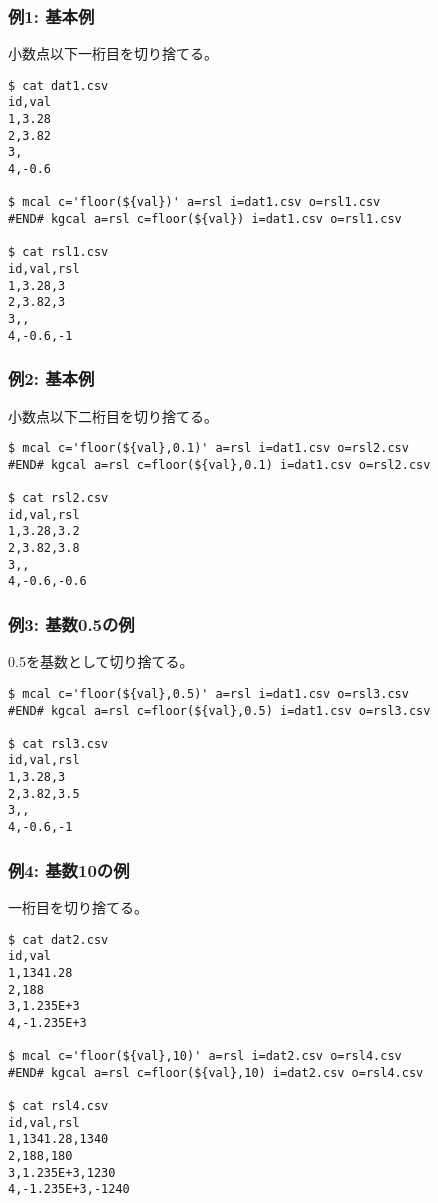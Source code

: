 
\subsubsection*{例1: 基本例}

小数点以下一桁目を切り捨てる。

\begin{Verbatim}[baselinestretch=0.7,frame=single]
$ cat dat1.csv
id,val
1,3.28
2,3.82
3,
4,-0.6

$ mcal c='floor(${val})' a=rsl i=dat1.csv o=rsl1.csv
#END# kgcal a=rsl c=floor(${val}) i=dat1.csv o=rsl1.csv

$ cat rsl1.csv
id,val,rsl
1,3.28,3
2,3.82,3
3,,
4,-0.6,-1
\end{Verbatim}

\subsubsection*{例2: 基本例}

小数点以下二桁目を切り捨てる。

\begin{Verbatim}[baselinestretch=0.7,frame=single]
$ mcal c='floor(${val},0.1)' a=rsl i=dat1.csv o=rsl2.csv
#END# kgcal a=rsl c=floor(${val},0.1) i=dat1.csv o=rsl2.csv

$ cat rsl2.csv
id,val,rsl
1,3.28,3.2
2,3.82,3.8
3,,
4,-0.6,-0.6
\end{Verbatim}

\subsubsection*{例3: 基数0.5の例}

0.5を基数として切り捨てる。

\begin{Verbatim}[baselinestretch=0.7,frame=single]
$ mcal c='floor(${val},0.5)' a=rsl i=dat1.csv o=rsl3.csv
#END# kgcal a=rsl c=floor(${val},0.5) i=dat1.csv o=rsl3.csv

$ cat rsl3.csv
id,val,rsl
1,3.28,3
2,3.82,3.5
3,,
4,-0.6,-1
\end{Verbatim}

\subsubsection*{例4: 基数10の例}

一桁目を切り捨てる。

\begin{Verbatim}[baselinestretch=0.7,frame=single]
$ cat dat2.csv
id,val
1,1341.28
2,188
3,1.235E+3
4,-1.235E+3

$ mcal c='floor(${val},10)' a=rsl i=dat2.csv o=rsl4.csv
#END# kgcal a=rsl c=floor(${val},10) i=dat2.csv o=rsl4.csv

$ cat rsl4.csv
id,val,rsl
1,1341.28,1340
2,188,180
3,1.235E+3,1230
4,-1.235E+3,-1240
\end{Verbatim}

